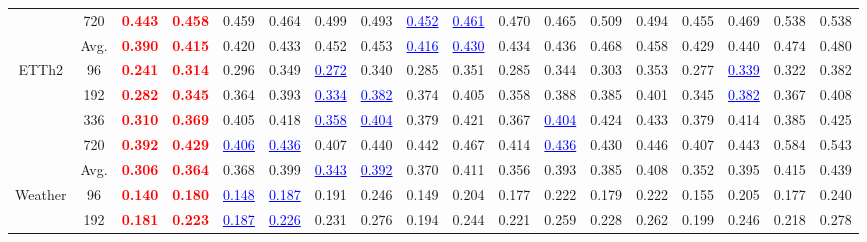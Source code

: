 \documentclass[final,3p,times]{elsarticle}
\begin{document}
\begin{table}[H]
{\begin{tabular}{cc|cc|cc|cc|cc|cc|cc|cc|cc}
 & 720 & \textcolor{red}{\textbf{0.443}} & \textcolor{red}{\textbf{0.458}} & 0.459 & 0.464 & 0.499 & 0.493 & \textcolor{blue}{\underline{0.452}} & \textcolor{blue}{\underline{0.461}} & 0.470 & 0.465 & 0.509 & 0.494 & 0.455 & 0.469 & 0.538 & 0.538 \\
\cmidrule(lr){2-18}
 & Avg. & \textcolor{red}{\textbf{0.390}} & \textcolor{red}{\textbf{0.415}} & 0.420 & 0.433 & 0.452 & 0.453 & \textcolor{blue}{\underline{0.416}} & \textcolor{blue}{\underline{0.430}} & 0.434 & 0.436 & 0.468 & 0.458 & 0.429 & 0.440 & 0.474 & 0.480 \\
\midrule
\multirow{5}{*}{ETTh2} & 96 & \textcolor{red}{\textbf{0.241}} & \textcolor{red}{\textbf{0.314}} & 0.296 & 0.349 & \textcolor{blue}{\underline{0.272}} & 0.340 & 0.285 & 0.351 & 0.285 & 0.344 & 0.303 & 0.353 & 0.277 & \textcolor{blue}{\underline{0.339}} & 0.322 & 0.382 \\
 & 192 & \textcolor{red}{\textbf{0.282}} & \textcolor{red}{\textbf{0.345}} & 0.364 & 0.393 & \textcolor{blue}{\underline{0.334}} & \textcolor{blue}{\underline{0.382}} & 0.374 & 0.405 & 0.358 & 0.388 & 0.385 & 0.401 & 0.345 & \textcolor{blue}{\underline{0.382}} & 0.367 & 0.408 \\
 & 336 & \textcolor{red}{\textbf{0.310}} & \textcolor{red}{\textbf{0.369}} & 0.405 & 0.418 & \textcolor{blue}{\underline{0.358}} & \textcolor{blue}{\underline{0.404}} & 0.379 & 0.421 & 0.367 & \textcolor{blue}{\underline{0.404}} & 0.424 & 0.433 & 0.379 & 0.414 & 0.385 & 0.425 \\
 & 720 & \textcolor{red}{\textbf{0.392}} & \textcolor{red}{\textbf{0.429}} & \textcolor{blue}{\underline{0.406}} & \textcolor{blue}{\underline{0.436}} & 0.407 & 0.440 & 0.442 & 0.467 & 0.414 & \textcolor{blue}{\underline{0.436}} & 0.430 & 0.446 & 0.407 & 0.443 & 0.584 & 0.543 \\
\cmidrule(lr){2-18}
 & Avg. & \textcolor{red}{\textbf{0.306}} & \textcolor{red}{\textbf{0.364}} & 0.368 & 0.399 & \textcolor{blue}{\underline{0.343}} & \textcolor{blue}{\underline{0.392}} & 0.370 & 0.411 & 0.356 & 0.393 & 0.385 & 0.408 & 0.352 & 0.395 & 0.415 & 0.439 \\
\midrule
\multirow{5}{*}{Weather} & 96 & \textcolor{red}{\textbf{0.140}} & \textcolor{red}{\textbf{0.180}} & \textcolor{blue}{\underline{0.148}} & \textcolor{blue}{\underline{0.187}} & 0.191 & 0.246 & 0.149 & 0.204 & 0.177 & 0.222 & 0.179 & 0.222 & 0.155 & 0.205 & 0.177 & 0.240 \\
 & 192 & \textcolor{red}{\textbf{0.181}} & \textcolor{red}{\textbf{0.223}} & \textcolor{blue}{\underline{0.187}} & \textcolor{blue}{\underline{0.226}} & 0.231 & 0.276 & 0.194 & 0.244 & 0.221 & 0.259 & 0.228 & 0.262 & 0.199 & 0.246 & 0.218 & 0.278 \\

\end{tabular}}
\end{table}
\end{document}
